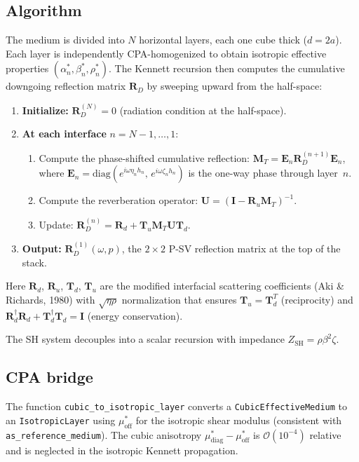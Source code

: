 \documentclass[11pt,a4paper]{article}
\newcommand{\order}{\mathcal{O}}
\begin{document}
\subsection{Algorithm}

The medium is divided into $N$ horizontal layers, each one cube thick
($d = 2a$).  Each layer is independently CPA-homogenized to obtain
isotropic effective properties $(\alpha^*_n, \beta^*_n, \rho^*_n)$.
The Kennett recursion then computes the cumulative downgoing
reflection matrix $\bm{R}_D$ by sweeping upward from the half-space:

\begin{enumerate}
  \item \textbf{Initialize:} $\bm{R}^{(N)}_D = 0$ (radiation condition
    at the half-space).
  \item \textbf{At each interface} $n = N{-}1, \ldots, 1$:
    \begin{enumerate}[label=(\alph*)]
      \item Compute the phase-shifted cumulative reflection:
        $\bm{M}_T = \bm{E}_n \bm{R}^{(n+1)}_D \bm{E}_n$,
        where $\bm{E}_n = \text{diag}(e^{i\omega\eta_n h_n},\,
        e^{i\omega\zeta_n h_n})$ is the one-way phase through layer~$n$.
      \item Compute the reverberation operator:
        $\bm{U} = (\bm{I} - \bm{R}_u \bm{M}_T)^{-1}$.
      \item Update:
        $\bm{R}^{(n)}_D = \bm{R}_d + \bm{T}_u \bm{M}_T \bm{U} \bm{T}_d$.
    \end{enumerate}
  \item \textbf{Output:} $\bm{R}^{(1)}_D(\omega, p)$, the $2 \times 2$
    P-SV reflection matrix at the top of the stack.
\end{enumerate}

Here $\bm{R}_d$, $\bm{R}_u$, $\bm{T}_d$, $\bm{T}_u$ are the
modified interfacial scattering coefficients (Aki \& Richards, 1980)
with $\sqrt{\eta\rho}$ normalization that ensures $\bm{T}_u = \bm{T}_d^T$
(reciprocity) and $\bm{R}_d^\dagger\bm{R}_d + \bm{T}_d^\dagger\bm{T}_d
= \bm{I}$ (energy conservation).

The SH system decouples into a scalar recursion with impedance
$Z_{\text{SH}} = \rho\beta^2\zeta$.

\subsection{CPA bridge}

The function \texttt{cubic\_to\_isotropic\_layer} converts a
\texttt{CubicEffectiveMedium} to an \texttt{IsotropicLayer} using
$\mu^*_{\text{off}}$ for the isotropic shear modulus (consistent with
\texttt{as\_reference\_medium}).  The cubic anisotropy
$\mu^*_{\text{diag}} - \mu^*_{\text{off}}$ is $\order(10^{-4})$
relative and is neglected in the isotropic Kennett propagation.
\end{document}
